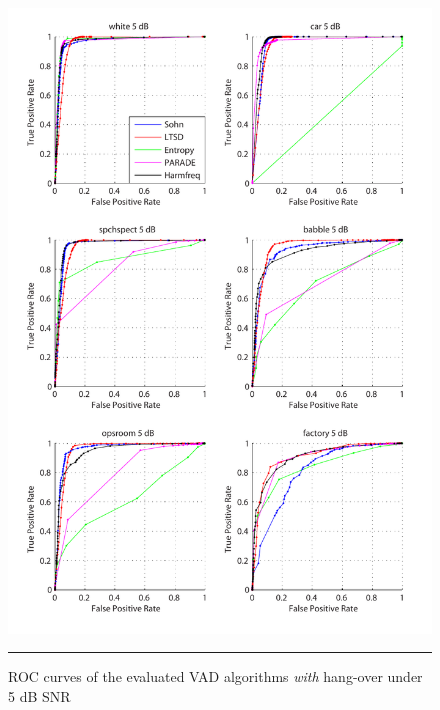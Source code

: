 \begin{figure}[htbp]
	\centering
		\includegraphics[width=1.0\columnwidth]{Figures/Chapter4/5dBh.pdf}
		\rule{37em}{0.5pt}
	\caption[ROC curves of the evaluated algorithms \emph{with} hang-over under 5 dB SNR]{ROC curves of the evaluated VAD algorithms \emph{with} hang-over under 5 dB SNR}
	\label{fig:5dBh}
\end{figure}

